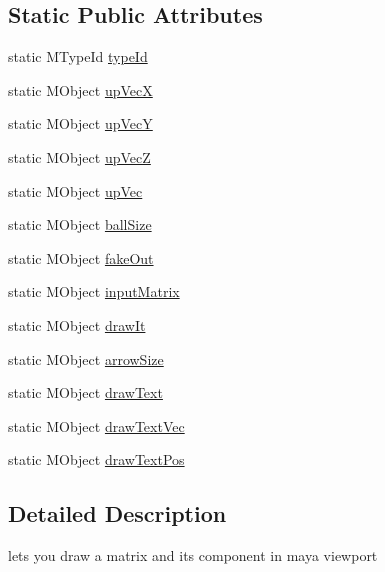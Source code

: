 \subsection*{Static Public Attributes}
\begin{DoxyCompactItemize}
\item 
static M\-Type\-Id \hyperlink{class_m_g__matrix_g_l_a75dbb68a56bba1adac39fb0ba441b9db}{type\-Id}
\item 
static M\-Object \hyperlink{class_m_g__matrix_g_l_a87088f365313b8f54aff381bb775a362}{up\-Vec\-X}
\item 
static M\-Object \hyperlink{class_m_g__matrix_g_l_a744964298d0a1ea37d1f1ea6942d9f41}{up\-Vec\-Y}
\item 
static M\-Object \hyperlink{class_m_g__matrix_g_l_a06ff38ae5efea2c74a4090cca49c4691}{up\-Vec\-Z}
\item 
static M\-Object \hyperlink{class_m_g__matrix_g_l_a484c3621def1530581ceaf161accedc4}{up\-Vec}
\item 
static M\-Object \hyperlink{class_m_g__matrix_g_l_ab52c9ead5ed04f77cecf150494a4da79}{ball\-Size}
\item 
static M\-Object \hyperlink{class_m_g__matrix_g_l_aa022ca409a739f2da5c80b29abd6f6dd}{fake\-Out}
\item 
static M\-Object \hyperlink{class_m_g__matrix_g_l_af55678e43c32e023ed89249bc7c852cd}{input\-Matrix}
\item 
static M\-Object \hyperlink{class_m_g__matrix_g_l_a632284a9caf3b739eb410610b884bd6f}{draw\-It}
\item 
static M\-Object \hyperlink{class_m_g__matrix_g_l_aac3b7859f05b724dd4183bc429053c70}{arrow\-Size}
\item 
static M\-Object \hyperlink{class_m_g__matrix_g_l_a2fba3030eb5babc2f98467d75177bf09}{draw\-Text}
\item 
static M\-Object \hyperlink{class_m_g__matrix_g_l_aebfa4a8cfd4b7e50f16d8687adc82750}{draw\-Text\-Vec}
\item 
static M\-Object \hyperlink{class_m_g__matrix_g_l_a480b4cbf60606b4cf9310d7daa2c3765}{draw\-Text\-Pos}
\end{DoxyCompactItemize}


\subsection{Detailed Description}
lets you draw a matrix and its component in maya viewport 

